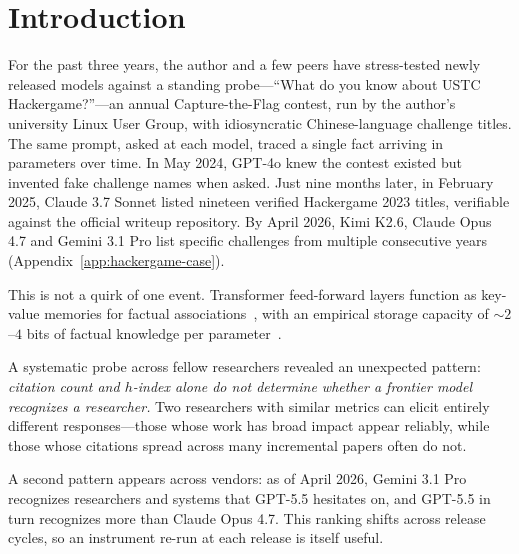 \documentclass[11pt]{article}
\begin{document}
\begin{abstract}
The widely-reported saturation of reasoning benchmarks does not imply the end of scaling. Procedural capability compresses under the ``Densing Law,'' but across 100 dated open-weight models the IKP time coefficient is $+0.0013$/month (95\% CI $[-0.0004, +0.0033]$, $p = 0.19$)---indistinguishable from zero, and rejecting the Densing prediction of $+0.0129$/month at $p < 10^{-15}$. Factual capacity continues to scale log-linearly with parameters across generations and across vendors.
\end{abstract}

\section{Introduction}
\label{sec:intro}

For the past three years, the author and a few peers have stress-tested newly released models against a standing probe---``What do you know about USTC Hackergame?''---an annual Capture-the-Flag contest, run by the author's university Linux User Group, with idiosyncratic Chinese-language challenge titles. The same prompt, asked at each model, traced a single fact arriving in parameters over time. In May 2024, GPT-4o knew the contest existed but invented fake challenge names when asked. Just nine months later, in February 2025, Claude 3.7 Sonnet listed nineteen verified Hackergame 2023 titles, verifiable against the official writeup repository. By April 2026, Kimi K2.6, Claude Opus 4.7 and Gemini 3.1 Pro list specific challenges from multiple consecutive years (Appendix~\ref{app:hackergame-case}).

This is not a quirk of one event. Transformer feed-forward layers function as key-value memories for factual associations~\citep{geva2021transformer, meng2022locating, dai2022knowledge}, with an empirical storage capacity of ${\sim}2$--$4$ bits of factual knowledge per parameter~\citep{allenzhu2025, morris2025memorize}.

A systematic probe across fellow researchers revealed an unexpected pattern: \emph{citation count and $h$-index alone do not determine whether a frontier model recognizes a researcher.} Two researchers with similar metrics can elicit entirely different responses---those whose work has broad impact appear reliably, while those whose citations spread across many incremental papers often do not.

A second pattern appears across vendors: as of April 2026, Gemini 3.1 Pro recognizes researchers and systems that GPT-5.5 hesitates on, and GPT-5.5 in turn recognizes more than Claude Opus 4.7. This ranking shifts across release cycles, so an instrument re-run at each release is itself useful.
\end{document}
